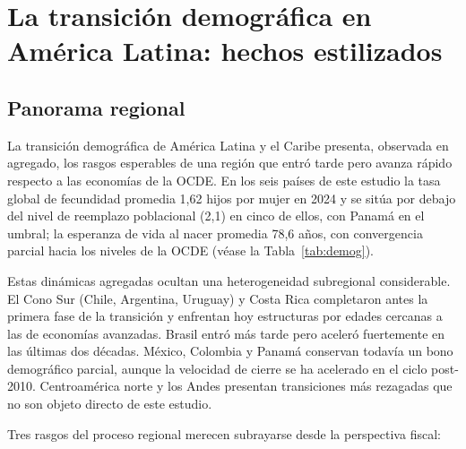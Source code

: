 \documentclass[12pt, letterpaper]{article}
\begin{document}
\newpage

\section{La transición demográfica en América Latina: hechos estilizados}
\label{sec:demografia}

\subsection{Panorama regional}

La transición demográfica de América Latina y el Caribe presenta, observada en
agregado, los rasgos esperables de una región que entró tarde pero avanza rápido
respecto a las economías de la OCDE. En los seis países de este estudio la tasa
global de fecundidad promedia 1{,}62 hijos por mujer en 2024 y se sitúa por debajo
del nivel de reemplazo poblacional (2{,}1) en cinco de ellos, con Panamá en el
umbral; la esperanza de vida al nacer promedia 78{,}6 años, con convergencia
parcial hacia los niveles de la OCDE (véase la Tabla~\ref{tab:demog}).

Estas dinámicas agregadas ocultan una heterogeneidad subregional considerable. El
Cono Sur (Chile, Argentina, Uruguay) y Costa Rica completaron antes la primera
fase de la transición y enfrentan hoy estructuras por edades cercanas a las de
economías avanzadas. Brasil entró más tarde pero aceleró fuertemente en las últimas
dos décadas. México, Colombia y Panamá conservan todavía un bono demográfico
parcial, aunque la velocidad de cierre se ha acelerado en el ciclo
post-2010. Centroamérica norte y los Andes presentan transiciones más rezagadas que
no son objeto directo de este estudio.

Tres rasgos del proceso regional merecen subrayarse desde la perspectiva fiscal:
\end{document}
